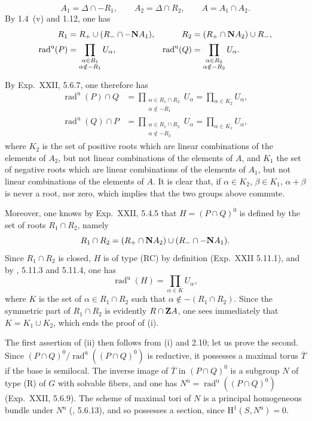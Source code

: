 \[
A_1=\Delta\cap-R_1,\qquad A_2=\Delta\cap R_2,\qquad A=A_1\cap A_2.
\]
By 1.4~(v) and 1.12, one has
\[
\begin{aligned}
R_1&=R_+\cup(R_-\cap-\mathbf{N} A_1),&
R_2&=(R_+\cap\mathbf{N} A_2)\cup R_-,\\
\operatorname{rad}^{\mathrm u}(P)&=\prod_{\substack{\alpha\in R_1\\\alpha\notin-R_1}}U_\alpha,&
\operatorname{rad}^{\mathrm u}(Q)&=\prod_{\substack{\alpha\in R_2\\\alpha\notin-R_2}}U_\alpha.
\end{aligned}
\]

By Exp.~XXII, 5.6.7, one therefore has
\[
\begin{aligned}
\operatorname{rad}^{\mathrm u}(P)\cap Q&=\prod_{\substack{\alpha\in R_1\cap R_2\\\alpha\notin-R_1}}U_\alpha=\prod_{\alpha\in K_2}U_\alpha,\\
\operatorname{rad}^{\mathrm u}(Q)\cap P&=\prod_{\substack{\alpha\in R_1\cap R_2\\\alpha\notin-R_2}}U_\alpha=\prod_{\alpha\in K_1}U_\alpha,
\end{aligned}
\]
where $K_2$ is the set of positive roots which are linear combinations of the elements of $A_2$, but not linear combinations of the elements of $A$, and $K_1$ the set of negative roots which are linear combinations of the elements of $A_1$, but not linear combinations of the elements of $A$. It is clear that, if $\alpha\in K_2$, $\beta\in K_1$, $\alpha+\beta$ is never a root, nor zero, which implies that the two groups above commute.

Moreover, one knows by Exp.~XXII, 5.4.5 that $H=(P\cap Q)^0$ is defined by the set of roots $R_1\cap R_2$, namely
\[
R_1\cap R_2=(R_+\cap\mathbf{N} A_2)\cup(R_-\cap-\mathbf{N} A_1).
\]
Since $R_1\cap R_2$ is closed, $H$ is of type (RC) by definition (Exp.~XXII 5.11.1), and by \loccit, 5.11.3 and 5.11.4, one has
\[
\operatorname{rad}^{\mathrm u}(H)=\prod_{\alpha\in K}U_\alpha,
\]
where $K$ is the set of $\alpha\in R_1\cap R_2$ such that $\alpha\notin-(R_1\cap R_2)$. Since the symmetric part of $R_1\cap R_2$ is evidently $R\cap\mathbf{Z} A$, one sees immediately that $K=K_1\cup K_2$, which ends the proof of (i).

The first assertion of (ii) then follows from (i) and 2.10; let us prove the second. Since $(P\cap Q)^0/\operatorname{rad}^{\mathrm u}((P\cap Q)^0)$ is reductive, it possesses a maximal torus $\overline T$ if the base is semilocal. The inverse image of $\overline T$ in $(P\cap Q)^0$ is a subgroup $N$ of type (R) of $G$ with solvable fibers, and one has $N^{\mathrm u}=\operatorname{rad}^{\mathrm u}((P\cap Q)^0)$ (Exp.~XXII, 5.6.9). The scheme of maximal tori of $N$ is a principal homogeneous bundle under $N^{\mathrm u}$ (\loccit, 5.6.13), and so possesses a section, since $\mathrm H^1(S,N^{\mathrm u})=0$.

